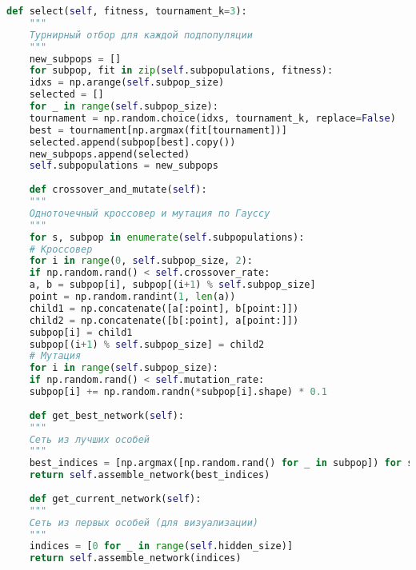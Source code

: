 \documentclass[a4paper,12pt]{article}
\begin{document}
\begin{lstlisting}[language=Python, caption={esp.py}]
	def select(self, fitness, tournament_k=3):
	"""
	Турнирный отбор для каждой подпопуляции
	"""
	new_subpops = []
	for subpop, fit in zip(self.subpopulations, fitness):
	idxs = np.arange(self.subpop_size)
	selected = []
	for _ in range(self.subpop_size):
	tournament = np.random.choice(idxs, tournament_k, replace=False)
	best = tournament[np.argmax(fit[tournament])]
	selected.append(subpop[best].copy())
	new_subpops.append(selected)
	self.subpopulations = new_subpops
	
	def crossover_and_mutate(self):
	"""
	Одноточечный кроссовер и мутация по Гауссу
	"""
	for s, subpop in enumerate(self.subpopulations):
	# Кроссовер
	for i in range(0, self.subpop_size, 2):
	if np.random.rand() < self.crossover_rate:
	a, b = subpop[i], subpop[(i+1) % self.subpop_size]
	point = np.random.randint(1, len(a))
	child1 = np.concatenate([a[:point], b[point:]])
	child2 = np.concatenate([b[:point], a[point:]])
	subpop[i] = child1
	subpop[(i+1) % self.subpop_size] = child2
	# Мутация
	for i in range(self.subpop_size):
	if np.random.rand() < self.mutation_rate:
	subpop[i] += np.random.randn(*subpop[i].shape) * 0.1
	
	def get_best_network(self):
	"""
	Сеть из лучших особей
	"""
	best_indices = [np.argmax([np.random.rand() for _ in subpop]) for subpop in self.subpopulations]
	return self.assemble_network(best_indices)
	
	def get_current_network(self):
	"""
	Сеть из первых особей (для визуализации)
	"""
	indices = [0 for _ in range(self.hidden_size)]
	return self.assemble_network(indices)
	
\end{lstlisting}
\end{document}
